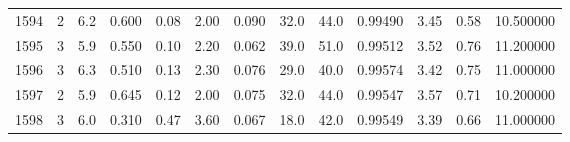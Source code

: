 \begin{tabular}{lrrrrrrrrrrrr}
1594 &        2 &            6.2 &             0.600 &         0.08 &            2.00 &      0.090 &                 32.0 &                  44.0 &  0.99490 &  3.45 &       0.58 &  10.500000 \\
1595 &        3 &            5.9 &             0.550 &         0.10 &            2.20 &      0.062 &                 39.0 &                  51.0 &  0.99512 &  3.52 &       0.76 &  11.200000 \\
1596 &        3 &            6.3 &             0.510 &         0.13 &            2.30 &      0.076 &                 29.0 &                  40.0 &  0.99574 &  3.42 &       0.75 &  11.000000 \\
1597 &        2 &            5.9 &             0.645 &         0.12 &            2.00 &      0.075 &                 32.0 &                  44.0 &  0.99547 &  3.57 &       0.71 &  10.200000 \\
1598 &        3 &            6.0 &             0.310 &         0.47 &            3.60 &      0.067 &                 18.0 &                  42.0 &  0.99549 &  3.39 &       0.66 &  11.000000 \\
\bottomrule
\end{tabular}
